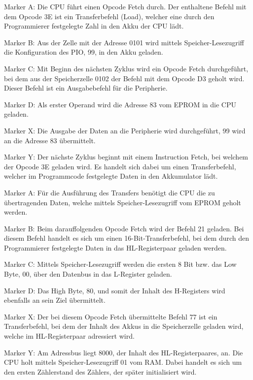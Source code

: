 Marker A: Die CPU führt einen Opcode Fetch durch. Der enthaltene Befehl mit dem Opcode 3E ist ein Transferbefehl (Load), welcher eine durch den Programmierer festgelegte Zahl in den Akku der CPU lädt.

Marker B: Aus der Zelle mit der Adresse 0101 wird mittels Speicher-Lesezugriff die Konfiguration des PIO, 99, in den Akku geladen.

Marker C: Mit Beginn des nächsten Zyklus wird ein Opcode Fetch durchgeführt, bei dem aus der Speicherzelle 0102 der Befehl mit dem Opcode D3 geholt wird. Dieser Befehl ist ein Ausgabebefehl für die Peripherie.

Marker D: Als erster Operand wird die Adresse 83 vom EPROM in die CPU geladen.

Marker X: Die Ausgabe der Daten an die Peripherie wird durchgeführt, 99 wird an die Adresse 83 übermittelt.

Marker Y: Der nächste Zyklus beginnt mit einem Instruction Fetch, bei welchem der Opcode 3E geladen wird. Es handelt sich dabei um einen Transferbefehl, welcher im Programmcode festgelegte Daten in den Akkumulator lädt.

Marker A: Für die Ausführung des Transfers benötigt die CPU die zu übertragenden Daten, welche mittels Speicher-Lesezugriff vom EPROM geholt werden.

Marker B: Beim darauffolgenden Opcode Fetch wird der Befehl 21 geladen. Bei diesem Befehl handelt es sich um einen 16-Bit-Transferbefehl, bei dem durch den Programmierer festgelegte Daten in das HL-Registerpaar geladen werden.

Marker C: Mittels Speicher-Lesezugriff werden die ersten 8 Bit bzw. das Low Byte, 00, über den Datenbus in das L-Register geladen.

Marker D: Das High Byte, 80, und somit der Inhalt des H-Registers wird ebenfalls an sein Ziel übermittelt.

Marker X: Der bei diesem Opcode Fetch übermittelte Befehl 77 ist ein Transferbefehl, bei dem der Inhalt des Akkus in die Speicherzelle geladen wird, welche im HL-Registerpaar adressiert wird.

Marker Y: Am Adressbus liegt 8000, der Inhalt des HL-Registerpaares, an. Die CPU holt mittels Speicher-Lesezugriff 01 vom RAM. Dabei handelt es sich um den ersten Zählerstand des Zählers, der später initialisiert wird.

